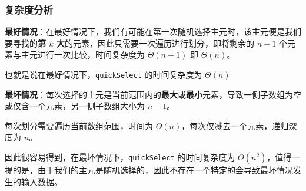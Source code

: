 \subsubsection{复杂度分析}

\textbf{最好情况}：在最好情况下，我们有可能在第一次随机选择主元时，该主元便是我们要寻找的\textbf{第 $k$ 大}的元素，因此只需要一次遍历进行划分，即将剩余的 $n - 1$ 个元素与主元进行一次比较，时间复杂度为 $\Theta(n - 1)$ 即 $\Theta(n)$。

也就是说在最好情况下，\texttt{quickSelect} 的时间复杂度为 $\Theta(n)$

\textbf{最坏情况}：每次选择的主元是当前范围内的\textbf{最大}或\textbf{最小}元素，导致一侧子数组为空或仅含一个元素，另一侧子数组大小为 $n - 1$。

每次划分需要遍历当前数组范围，时间为 $\Theta(n)$，每次仅减去一个元素，递归深度为 $n$。

因此很容易得到，在最坏情况下，\texttt{quickSelect} 的时间复杂度为 $\Theta(n^2)$，值得一提的是，由于我们的主元是随机选择的，因此不存在一个特定的会导致最坏情况发生的输入数据。

